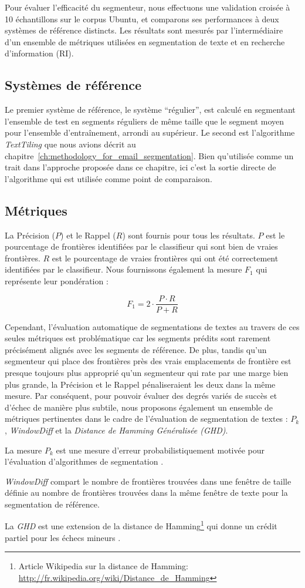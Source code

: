 Pour évaluer l'efficacité du segmenteur, nous effectuons une validation croisée à 10 échantillons sur le corpus Ubuntu, et comparons ses performances à deux systèmes de référence distincts. Les résultats sont mesurés par l'intermédiaire d'un ensemble de métriques utilisées en segmentation de texte et en recherche d'information (RI).

\subsection{Systèmes de référence}

Le premier système de référence, le système ``régulier'', est calculé en segmentant l'ensemble de test en segments réguliers de même taille que le segment moyen pour l'ensemble d'entraînement, arrondi au supérieur. Le second est l'algorithme \textit{TextTiling} que nous avions décrit au chapitre~\ref{ch:methodology_for_email_segmentation}. Bien qu'utilisée comme un trait dans l'approche proposée dans ce chapitre, ici c'est la sortie directe de l'algorithme qui est utilisée comme point de comparaison.

\subsection{Métriques}

La Précision ($P$) et le Rappel ($R$) sont fournis pour tous les résultats. $P$ est le pourcentage de frontières identifiées par le classifieur qui sont bien de vraies frontières. $R$ est le pourcentage de vraies frontières qui ont été correctement identifiées par le classifieur. Nous fournissons également la mesure $F_1$ qui représente leur pondération :

\[
F_1 = 2 \cdot \frac{P \cdot R}{P + R}
\]

Cependant, l'évaluation automatique de segmentations de textes au travers de ces seules métriques est problématique car les segments prédits sont rarement précisément alignés avec les segments de référence. De plus, tandis qu'un segmenteur qui place des frontières près des vrais emplacements de frontière est presque toujours plus approprié qu'un segmenteur qui rate par une marge bien plus grande, la Précision et le Rappel pénaliseraient les deux dans la même mesure. Par conséquent, pour pouvoir évaluer des degrés variés de succès et d'échec de manière plus subtile, nous proposons également un ensemble de métriques pertinentes dans le cadre de l'évaluation de segmentation de textes : ${P_{k}}$, \textit{WindowDiff} et la \textit{Distance de Hamming Généralisée (GHD)}.

La mesure ${P_{k}}$ est une mesure d'erreur probabilistiquement motivée pour l'évaluation d'algorithmes de segmentation \cite{beeferman1999statistical}.

\textit{WindowDiff} compart le nombre de frontières trouvées dans une fenêtre de taille définie au nombre de frontières trouvées dans la même fenêtre de texte pour la segmentation de référence.

La \textit{GHD} est une extension de la distance de Hamming\footnote{Article Wikipedia sur la distance de Hamming: \url{http://fr.wikipedia.org/wiki/Distance_de_Hamming}} qui donne un crédit partiel pour les échecs mineurs \cite{bookstein2002generalized}.